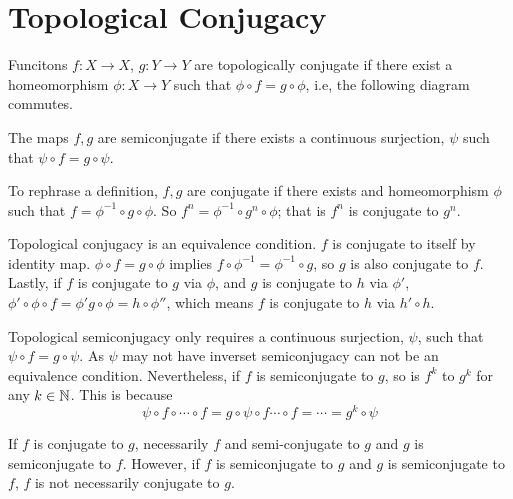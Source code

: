 \section{Topological Conjugacy}

\begin{defn}
Funcitons $f: X \rightarrow X$, $g:  Y \rightarrow Y$ are topologically conjugate if there exist a homeomorphism $\phi: X \rightarrow Y$ such that 
$\phi \circ f = g \circ \phi$,
i.e, the following diagram commutes.
\begin{center}
\end{center}

The maps $f,g$ are semiconjugate if there exists a continuous surjection, $\psi$ such that $\psi \circ f = g \circ \psi$.
\end{defn}


To rephrase a definition, $f,g$ are conjugate if there exists and homeomorphism $\phi$ such that $f = \phi^{-1} \circ g \circ \phi$.
So $f^{n} = \phi^{-1} \circ g^{n} \circ \phi$; that is $f^n$ is conjugate to $g^n$.

Topological conjugacy is an equivalence condition. 
$f$ is conjugate to itself by identity map. 
$\phi \circ f = g \circ \phi$ implies $f \circ \phi^{-1} = \phi^{-1} \circ g$, so $g$ is also conjugate to $f$.
Lastly, if $f$  is conjugate to $g$ via $\phi$, and $g$ is conjugate to $h$ via $\phi'$, $\phi' \circ \phi \circ f = \phi' g \circ \phi = h \circ \phi'' $, which means $f$ is conjugate to $h$ via $h' \circ h$.

Topological semiconjugacy only requires a continuous surjection, $\psi$, such that $\psi \circ f = g \circ \psi$. 
As $\psi$ may not have inverset semiconjugacy can not be an equivalence condition.
Nevertheless, if $f$ is semiconjugate to $g$, so is $f^{k}$ to $g^{k}$ for any $k \in \mathbb{N}$. 
This is because 
$$
	\psi \circ f\circ \cdots \circ f = g \circ \psi \circ f \cdots \circ f = \cdots = g^k \circ \psi
$$

If $f$ is conjugate to $g$, necessarily $f$ and semi-conjugate to $g$ and $g$ is semiconjugate to $f$. 
However, if $f$ is semiconjugate to $g$ and $g$ is semiconjugate to $f$, $f$ is not necessarily conjugate to $g$. 

